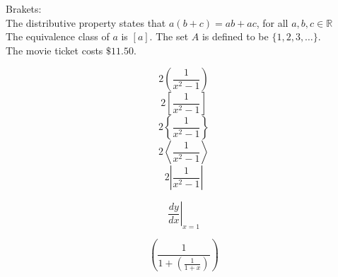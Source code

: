 \documentclass[11pt]{article}
\begin{document}
Brakets:\\[6pt]
The distributive property states that $a(b+c) = ab+ac$, for all $a, b, c \in \mathbb{R}$\\[6pt]
The equivalence class of $a$ is $[a]$.
The set $A$ is defined to be $\{1, 2, 3, \dots \}$.\\[6pt]
The movie ticket costs $\$11.50$.

$$2\left(\frac{1}{x^2 - 1}\right)$$
$$2\left[\frac{1}{x^2 - 1}\right]$$
$$2\left\{\frac{1}{x^2 - 1}\right\}$$
$$2\left\langle\frac{1}{x^2 - 1}\right\rangle$$
$$2\left|\frac{1}{x^2 - 1}\right|$$

$$\left.\frac{dy}{dx}\right|_{x=1}$$

$$\left(\frac{1}{1+\left(\frac{1}{1+x}\right)}\right)$$
\end{document}
